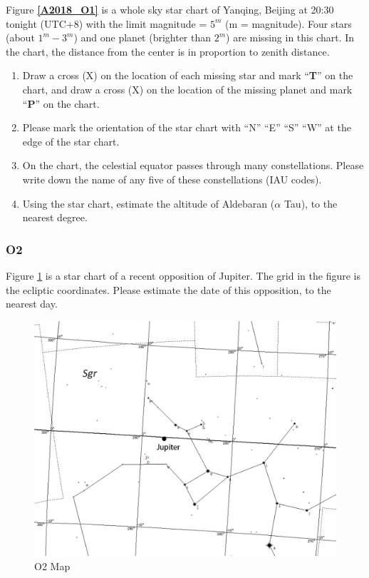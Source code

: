 \documentclass[a4paper,12pt]{extarticle}
\begin{document}
Figure \textbf{\ref{A2018_O1}} is a whole sky star chart of Yanqing, Beijing at 20:30 tonight (UTC+8) with the limit magnitude = $5^m$ (m = magnitude). Four stars (about $1^m - 3^m$) and one planet (brighter than $2^m$) are missing in this chart. In the chart, the distance from the center is in proportion to zenith distance.

\begin{enumerate}
    \item Draw a cross (X) on the location of each missing star and mark “\textbf{T}” on the chart, and draw a cross (X) on the location of the missing planet and mark “\textbf{P}” on the chart.
    \item Please mark the orientation of the star chart with “N” “E” “S” “W” at the edge of the star chart.
    \item On the chart, the celestial equator passes through many constellations. Please write down the name of any five of these constellations (IAU codes).
    \item Using the star chart, estimate the altitude of Aldebaran ($\alpha$ Tau), to the nearest degree. 
\end{enumerate}

\subsubsection{O2}

Figure \ref{A2018_O2} is a star chart of a recent opposition of Jupiter. The grid in the figure is the ecliptic coordinates. Please estimate the date of this opposition, to the nearest day.

\begin{figure}[H]
    \centering
    \includegraphics[width=0.95\linewidth]{18_O2.png}
    \caption{O2 Map}
    \label{A2018_O2}
\end{figure}
\end{document}
